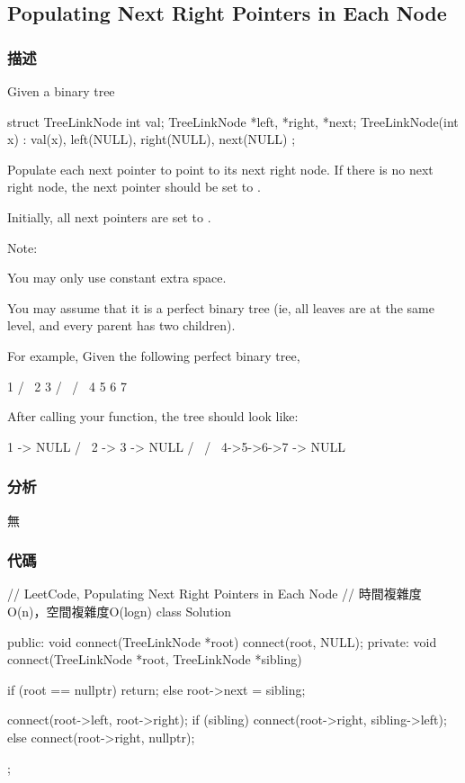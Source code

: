 \subsection{Populating Next Right Pointers in Each Node} %
\label{sec:populating-next-right-pointers-in-each-node}


\subsubsection{描述}
Given a binary tree
\begin{Code}
struct TreeLinkNode {
   int val;
   TreeLinkNode *left, *right, *next;
   TreeLinkNode(int x) : val(x), left(NULL), right(NULL), next(NULL) {}
};
\end{Code}

Populate each next pointer to point to its next right node. If there is no next right node, the next pointer should be set to .

Initially, all next pointers are set to .

Note:
\begindot
\item You may only use constant extra space.
\item You may assume that it is a perfect binary tree (ie, all leaves are at the same level, and every parent has two children).
\myenddot

For example,
Given the following perfect binary tree,
\begin{Code}
         1
       /  \
      2    3
     / \  / \
    4  5  6  7
\end{Code}

After calling your function, the tree should look like:
\begin{Code}
         1 -> NULL
       /  \
      2 -> 3 -> NULL
     / \  / \
    4->5->6->7 -> NULL
\end{Code}


\subsubsection{分析}
無

\subsubsection{代碼}

\begin{Code}
// LeetCode, Populating Next Right Pointers in Each Node
// 時間複雜度O(n)，空間複雜度O(logn)
class Solution {
public:
    void connect(TreeLinkNode *root) {
        connect(root, NULL);
    }
private:
    void connect(TreeLinkNode *root, TreeLinkNode *sibling) {
        if (root == nullptr)
            return;
        else
            root->next = sibling;

        connect(root->left, root->right);
        if (sibling)
            connect(root->right, sibling->left);
        else
            connect(root->right, nullptr);
    }
};
\end{Code}


